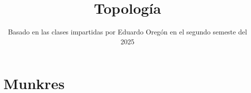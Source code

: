\documentclass[a4paper]{report}
\title{Topología}
\author{}
\date{Basado en las clases impartidas por Eduardo Oregón en el segundo semeste del 2025}
\begin{document}
    \maketitle
    \tableofcontents

    \chapter{Munkres}
    \setcounter{section}{0}

	
	

	


\end{document}
